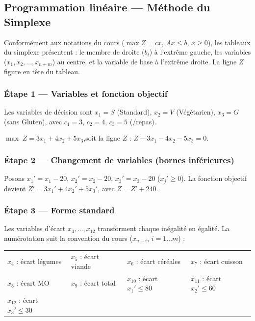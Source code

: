\documentclass[12pt,a4paper]{article}
\begin{document}
\subsection{Programmation linéaire — Méthode du Simplexe}

Conformément aux notations du cours ($\max Z = cx$, $Ax \leq b$, $x \geq 0$),
les tableaux du simplexe présentent : le membre de droite ($b_i$) à l'extrême
gauche, les variables ($x_1, x_2, \ldots, x_{n+m}$) au centre, et la variable
de base à l'extrême droite. La ligne $Z$ figure en tête du tableau.

\subsubsection{Étape 1 — Variables et fonction objectif}

Les variables de décision sont $x_1 = S$ (Standard), $x_2 = V$ (Végétarien),
$x_3 = G$ (sans Gluten), avec $c_1=3$, $c_2=4$, $c_3=5$ (\texteuro/repas).

\noindent$\max\; Z = 3x_1 + 4x_2 + 5x_3$,\quad soit la ligne $Z$ : $Z - 3x_1 - 4x_2 - 5x_3 = 0$.

\subsubsection{Étape 2 — Changement de variables (bornes inférieures)}

Posons $x_1' = x_1-20$, $x_2' = x_2-20$, $x_3' = x_3-20$ ($x_j' \geq 0$).
La fonction objectif devient $Z' = 3x_1' + 4x_2' + 5x_3'$, avec $Z = Z'+240$.

\subsubsection{Étape 3 — Forme standard}

Les variables d'écart $x_4, \ldots, x_{12}$ transforment chaque inégalité en
égalité. La numérotation suit la convention du cours ($x_{n+i}$, $i=1\ldots m$) :

\begin{center}\small
\begin{tabular}{ll|ll}
$x_4$ : écart légumes   & $x_5$ : écart viande    &
$x_6$ : écart céréales  & $x_7$ : écart cuisson \\
$x_8$ : écart MO        & $x_9$ : écart total     &
$x_{10}$ : écart $x_1'\leq 80$ & $x_{11}$ : écart $x_2'\leq 60$ \\
$x_{12}$ : écart $x_3'\leq 30$ & & &
\end{tabular}
\end{center}
\end{document}
